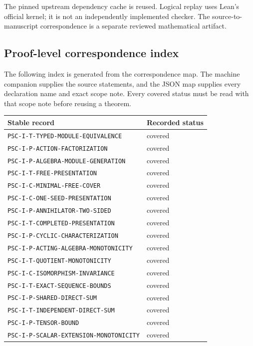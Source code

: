 The pinned upstream dependency cache is reused. Logical replay uses Lean's official kernel; it is not an independently implemented checker. The source-to-manuscript correspondence is a separate reviewed mathematical artifact.


\subsection{Proof-level correspondence index}
The following index is generated from the correspondence map. The machine companion supplies the source statements, and the JSON map supplies every declaration name and exact scope note. Every covered status must be read with that scope note before reusing a theorem.

{\small
\begin{longtable}{p{}p{}}
\toprule Stable record & Recorded status \\\midrule\endhead
\nolinkurl{PSC-I-T-TYPED-MODULE-EQUIVALENCE} & covered \\
\nolinkurl{PSC-I-P-ACTION-FACTORIZATION} & covered \\
\nolinkurl{PSC-I-P-ALGEBRA-MODULE-GENERATION} & covered \\
\nolinkurl{PSC-I-T-FREE-PRESENTATION} & covered \\
\nolinkurl{PSC-I-C-MINIMAL-FREE-COVER} & covered \\
\nolinkurl{PSC-I-C-ONE-SEED-PRESENTATION} & covered \\
\nolinkurl{PSC-I-P-ANNIHILATOR-TWO-SIDED} & covered \\
\nolinkurl{PSC-I-T-COMPLETED-PRESENTATION} & covered \\
\nolinkurl{PSC-I-P-CYCLIC-CHARACTERIZATION} & covered \\
\nolinkurl{PSC-I-P-ACTING-ALGEBRA-MONOTONICITY} & covered \\
\nolinkurl{PSC-I-T-QUOTIENT-MONOTONICITY} & covered \\
\nolinkurl{PSC-I-C-ISOMORPHISM-INVARIANCE} & covered \\
\nolinkurl{PSC-I-T-EXACT-SEQUENCE-BOUNDS} & covered \\
\nolinkurl{PSC-I-P-SHARED-DIRECT-SUM} & covered \\
\nolinkurl{PSC-I-T-INDEPENDENT-DIRECT-SUM} & covered \\
\nolinkurl{PSC-I-P-TENSOR-BOUND} & covered \\
\nolinkurl{PSC-I-P-SCALAR-EXTENSION-MONOTONICITY} & covered \\

\end{longtable}}
